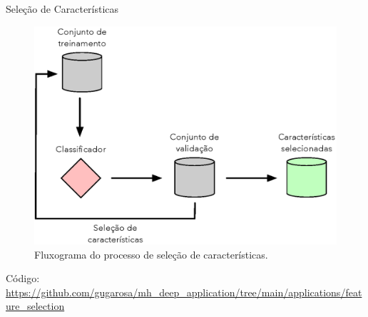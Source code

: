 \begin{frame}{Seleção de Características}
	\begin{figure}
		\centering
		\includegraphics[scale=0.45]{figs/feature_selection.eps}	
		\caption{Fluxograma do processo de seleção de características.}
		\label{f.feature_selection}
	\end{figure}
	Código: \url{https://github.com/gugarosa/mh_deep_application/tree/main/applications/feature_selection}
\end{frame}